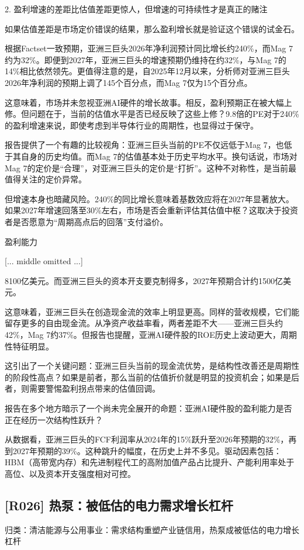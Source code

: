 \documentclass[11pt]{ctexart}
\begin{document}
2. 盈利增速的差距比估值差距更惊人，但增速的可持续性才是真正的赌注

如果估值差距是市场定价错误的结果，那么盈利增长就是验证这个错误的试金石。

根据Factset一致预期，亚洲三巨头2026年净利润预计同比增长约240\%，而Mag 7约为32\%。即便到2027年，亚洲三巨头的增速预期仍维持在约32\%，与Mag 7的14\%相比依然领先。更值得注意的是，自2025年12月以来，分析师对亚洲三巨头2026年净利润的预期上调了145个百分点，而Mag 7仅为15个百分点。

这意味着，市场并未忽视亚洲AI硬件的增长故事。相反，盈利预期正在被大幅上修。但问题在于，当前的估值水平是否已经反映了这些上修？9.8倍的PE对于240\%的盈利增速来说，即使考虑到半导体行业的周期性，也显得过于保守。

报告提供了一个有趣的比较视角：亚洲三巨头当前的PE不仅远低于Mag 7，也低于其自身的历史均值。而Mag 7的估值基本处于历史平均水平。换句话说，市场对Mag 7的定价是“合理”，对亚洲三巨头的定价是“打折”。这种不对称性，是当前最值得关注的定价异常。

但增速本身也暗藏风险。240\%的同比增长意味着基数效应将在2027年显著放大。如果2027年增速回落至30\%左右，市场是否会重新评估其估值中枢？这取决于投资者是否愿意为“周期高点后的回落”支付溢价。

盈利能力

[... middle omitted ...]

8100亿美元。而亚洲三巨头的资本开支要克制得多，2027年预期合计约1500亿美元。

这意味着，亚洲三巨头在创造现金流的效率上明显更高。同样的营收规模，它们能留存更多的自由现金流。从净资产收益率看，两者差距不大——亚洲三巨头约42\%，Mag 7约37\%。但报告也提醒，亚洲AI硬件股的ROE历史上波动更大，周期性特征明显。

这引出了一个关键问题：亚洲三巨头当前的现金流优势，是结构性改善还是周期性的阶段性高点？如果是前者，那么当前的估值折价就是明显的投资机会；如果是后者，则需要警惕盈利拐点带来的估值回调。

报告在多个地方暗示了一个尚未完全展开的命题：亚洲AI硬件股的盈利能力是否正在经历一次结构性跃升？

从数据看，亚洲三巨头的FCF利润率从2024年的15\%跃升至2026年预期的32\%，再到2027年预期的39\%。这种跳升的幅度，在历史上并不多见。驱动因素包括：HBM（高带宽内存）和先进制程代工的高附加值产品占比提升、产能利用率处于高位、以及资本开支强度相对可控。

\subsection{[R026] 热泵：被低估的电力需求增长杠杆}
{\small\color{refgray}归类：清洁能源与公用事业：需求结构重塑产业链信用，热泵成被低估的电力增长杠杆}
\end{document}
